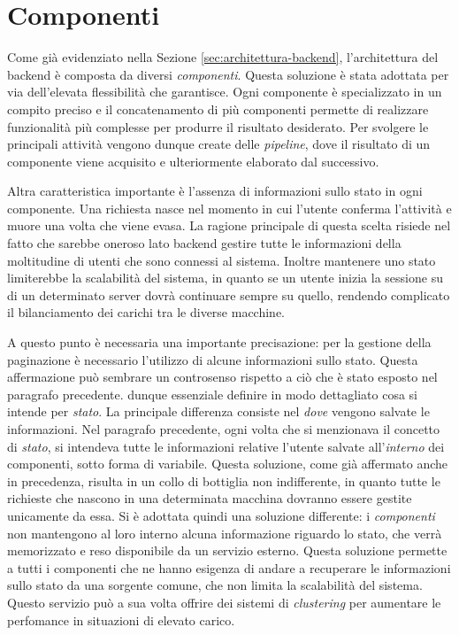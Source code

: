 \section{Componenti\label{sec:componenti-backend}}

Come già evidenziato nella Sezione \ref{sec:architettura-backend}, l'architettura del backend è composta da diversi \emph{componenti}. Questa soluzione è stata adottata per via dell'elevata flessibilità che garantisce. Ogni componente è specializzato in un compito preciso e il concatenamento di più componenti permette di realizzare funzionalità più complesse per produrre il risultato desiderato. Per svolgere le principali attività vengono dunque create delle \emph{pipeline}, dove il risultato di un componente viene acquisito e ulteriormente elaborato dal successivo.

Altra caratteristica importante è l'assenza di informazioni sullo stato in ogni componente. Una richiesta nasce nel momento in cui l'utente conferma l'attività e muore una volta che viene evasa. La ragione principale di questa scelta risiede nel fatto che sarebbe oneroso lato backend gestire tutte le informazioni della moltitudine di utenti che sono connessi al sistema. Inoltre mantenere uno stato limiterebbe la scalabilità del sistema, in quanto se un utente inizia la sessione su di un determinato server dovrà continuare sempre su quello, rendendo complicato il bilanciamento dei carichi tra le diverse macchine.

A questo punto è necessaria una importante precisazione: per la gestione della paginazione è necessario l'utilizzo di alcune informazioni sullo stato. Questa affermazione può sembrare un controsenso rispetto a ciò che è stato esposto nel paragrafo precedente. \upe dunque essenziale definire in modo dettagliato cosa si intende per \emph{stato}. La principale differenza consiste nel \emph{dove} vengono salvate le informazioni. Nel paragrafo precedente, ogni volta che si menzionava il concetto di \emph{stato}, si intendeva tutte le informazioni relative l'utente salvate all'\emph{interno} dei componenti, sotto forma di variabile. Questa soluzione, come già affermato anche in precedenza, risulta in un collo di bottiglia non indifferente, in quanto tutte le richieste che nascono in una determinata macchina dovranno essere gestite unicamente da essa. Si è adottata quindi una soluzione differente: i \emph{componenti} non mantengono al loro interno alcuna informazione riguardo lo stato, che verrà memorizzato e reso disponibile da un servizio esterno. Questa soluzione permette a tutti i componenti che ne hanno esigenza di andare a recuperare le informazioni sullo stato da una sorgente comune, che non limita la scalabilità del sistema. Questo servizio può a sua volta offrire dei sistemi di \emph{clustering} per aumentare le perfomance in situazioni di elevato carico.

